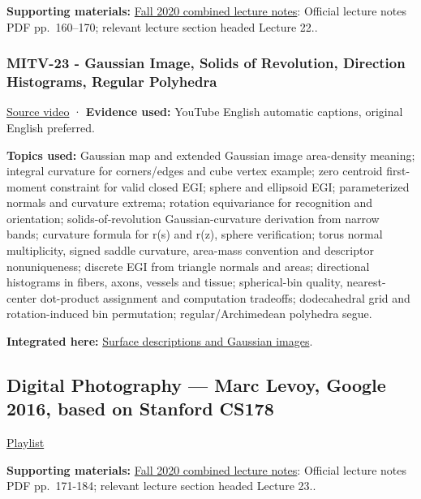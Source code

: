 \textbf{Supporting materials:} \href{https://ocw.mit.edu/courses/6-801-machine-vision-fall-2020/9ec44f69e72995c370b3797818ba01e6_MIT6_801F20_lectureNotes.pdf}{Fall 2020 combined lecture notes}: Official lecture notes PDF pp.~160--170; relevant lecture section headed Lecture 22..

\subsubsection{MITV-23 - Gaussian Image, Solids of Revolution, Direction Histograms, Regular Polyhedra}\label{04-visual-computing-ii-ch036-mitv-23---gaussian-image-solids-of-revolution-direction-histograms-regular-polyhedra}

\href{https://www.youtube.com/watch?v=s9wu_z8EKAc}{Source video} · \textbf{Evidence used:} YouTube English automatic captions, original English preferred.

\textbf{Topics used:} Gaussian map and extended Gaussian image area-density meaning; integral curvature for corners/edges and cube vertex example; zero centroid first-moment constraint for valid closed EGI; sphere and ellipsoid EGI; parameterized normals and curvature extrema; rotation equivariance for recognition and orientation; solids-of-revolution Gaussian-curvature derivation from narrow bands; curvature formula for r(s) and r(z), sphere verification; torus normal multiplicity, signed saddle curvature, area-mass convention and descriptor nonuniqueness; discrete EGI from triangle normals and areas; directional histograms in fibers, axons, vessels and tissue; spherical-bin quality, nearest-center dot-product assignment and computation tradeoffs; dodecahedral grid and rotation-induced bin permutation; regular/Archimedean polyhedra segue.

\textbf{Integrated here:} \hyperref[04-visual-computing-ii-ch032-surface-descriptions-and-gaussian-images]{Surface descriptions and Gaussian images}.

\subsection{Digital Photography --- Marc Levoy, Google 2016, based on Stanford CS178}\label{04-visual-computing-ii-ch036-digital-photography-marc-levoy-google-2016-based-on-stanford-cs178}

\href{https://www.youtube.com/playlist?list=PL7ddpXYvFXspUN0N-gObF1GXoCA-DA-7i}{Playlist}

\textbf{Supporting materials:} \href{https://ocw.mit.edu/courses/6-801-machine-vision-fall-2020/9ec44f69e72995c370b3797818ba01e6_MIT6_801F20_lectureNotes.pdf}{Fall 2020 combined lecture notes}: Official lecture notes PDF pp.~171-184; relevant lecture section headed Lecture 23..

